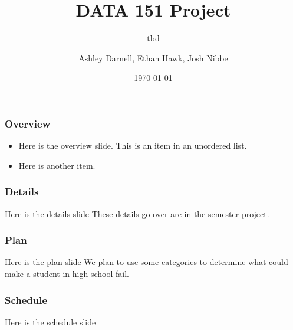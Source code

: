 \documentclass{beamer}
\title{DATA 151 Project}
\subtitle{tbd}
\author{Ashley Darnell, Ethan Hawk, Josh Nibbe}
\institute{Valparaiso Unviersity}
\date{\today}
\begin{document}
\begin{frame}
\titlepage
\end{frame}


\begin{frame}
\frametitle{Overview}
  \begin{itemize}
    \item Here is the overview slide. This is an item in an unordered list.

    \item Here is another item.
  \end{itemize}
\end{frame}


\begin{frame}
\frametitle{Details}
Here is the details slide
These details go over are in the semester project.  
\end{frame}


\begin{frame}
\frametitle{Plan}
Here is the plan slide
We plan to use some categories to determine what could make a student in high school fail. 
\end{frame}

\begin{frame}
\frametitle{Schedule}
Here is the schedule slide
\end{frame}
\end{document}
